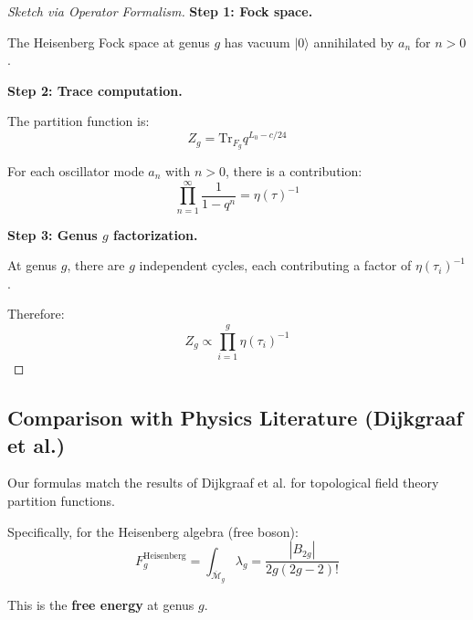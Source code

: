 \begin{proof}[Sketch via Operator Formalism]

\textbf{Step 1: Fock space.}

The Heisenberg Fock space at genus $g$ has vacuum $|0\rangle$ annihilated by $a_n$ 
for $n > 0$.

\textbf{Step 2: Trace computation.}

The partition function is:
$$Z_g = \text{Tr}_{F_g} q^{L_0 - c/24}$$

For each oscillator mode $a_n$ with $n > 0$, there is a contribution:
$$\prod_{n=1}^{\infty} \frac{1}{1 - q^n} = \eta(\tau)^{-1}$$

\textbf{Step 3: Genus $g$ factorization.}

At genus $g$, there are $g$ independent cycles, each contributing a factor of 
$\eta(\tau_i)^{-1}$.

Therefore:
$$Z_g \propto \prod_{i=1}^{g} \eta(\tau_i)^{-1}$$
\end{proof}

\subsection{Comparison with Physics Literature (Dijkgraaf et al.)}
\label{subsec:physics-comparison}

\begin{theorem}\label{thm:dmvv-agreement}
Our formulas match the results of Dijkgraaf et al. \cite{DMVV} for topological 
field theory partition functions.

Specifically, for the Heisenberg algebra (free boson):
\begin{equation}
F_g^{\text{Heisenberg}} = \int_{\overline{\mathcal{M}}_g} \lambda_g 
= \frac{|B_{2g}|}{2g(2g-2)!}
\end{equation}

This is the \textbf{free energy} at genus $g$.
\end{theorem}

